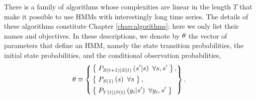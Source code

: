 There is a family of algorithms whose complexities are linear in the
length $T$ that make it possible to use HMMs with interestingly long
time series.  The details of these algorithms constitute Chapter
\ref{chap:algorithms}; here we only list their names and objectives.
In these descriptions, we denote by $\theta$ the vector of
parameters that define an HMM, namely the state transition
probabilities, the initial state probabilities, and the conditional
observation probabilities,
\begin{equation*}
   \theta \equiv \left\{
     \begin{aligned}
       &\left\{\; P_{{S}{(t+1)}|{S}{(t)}} \left(s'|s
       \right)~\forall s,s' \;\right\},\\
       & \left\{\; P_{{S}{(1)}} \left(s \right)~\forall s
       \;\right\},\\
       &  \left\{\; P_{{Y}{(t)}|{S}{(t)}} \left(y_i|s' \right)
       ~ \forall y_i,s' \;\right\}
     \end{aligned}
   \right\}.
\end{equation*}
